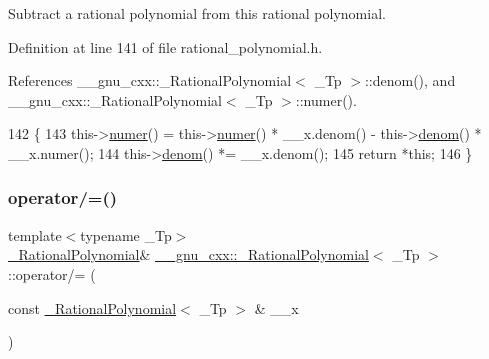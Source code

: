 Subtract a rational polynomial from this rational polynomial. 

Definition at line 141 of file rational\+\_\+polynomial.\+h.



References \+\_\+\+\_\+gnu\+\_\+cxx\+::\+\_\+\+Rational\+Polynomial$<$ \+\_\+\+Tp $>$\+::denom(), and \+\_\+\+\_\+gnu\+\_\+cxx\+::\+\_\+\+Rational\+Polynomial$<$ \+\_\+\+Tp $>$\+::numer().


\begin{DoxyCode}
142       \{
143         this->\hyperlink{class____gnu__cxx_1_1__RationalPolynomial_aa42ac2f6c2368cae05ba3a3cebf0fa24}{numer}() = this->\hyperlink{class____gnu__cxx_1_1__RationalPolynomial_aa42ac2f6c2368cae05ba3a3cebf0fa24}{numer}() * \_\_x.denom() - this->\hyperlink{class____gnu__cxx_1_1__RationalPolynomial_a05e84913ccfddcf6fcbfe623cb56c937}{denom}() * \_\_x.numer();
144         this->\hyperlink{class____gnu__cxx_1_1__RationalPolynomial_a05e84913ccfddcf6fcbfe623cb56c937}{denom}() *= \_\_x.denom();
145         \textcolor{keywordflow}{return} *\textcolor{keyword}{this};
146       \}
\end{DoxyCode}
\mbox{\label{class____gnu__cxx_1_1__RationalPolynomial_aa730392e9487843aad01fb28328ce032}} 
\subsubsection{\texorpdfstring{operator/=()}{operator/=()}}
{\footnotesize\ttfamily template$<$typename \+\_\+\+Tp$>$ \\
\hyperlink{class____gnu__cxx_1_1__RationalPolynomial}{\+\_\+\+Rational\+Polynomial}\& \hyperlink{class____gnu__cxx_1_1__RationalPolynomial}{\+\_\+\+\_\+gnu\+\_\+cxx\+::\+\_\+\+Rational\+Polynomial}$<$ \+\_\+\+Tp $>$\+::operator/= (\begin{DoxyParamCaption}\item[{const \hyperlink{class____gnu__cxx_1_1__RationalPolynomial}{\+\_\+\+Rational\+Polynomial}$<$ \+\_\+\+Tp $>$ \&}]{\+\_\+\+\_\+x }\end{DoxyParamCaption})\hspace{0.3cm}{\ttfamily [inline]}}

